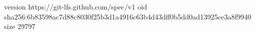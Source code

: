 version https://git-lfs.github.com/spec/v1
oid sha256:6b83598ac7d88c8030f25b3d1a4916c63b4d43dff0b5dd0ad13925ce3a8f9940
size 29797
